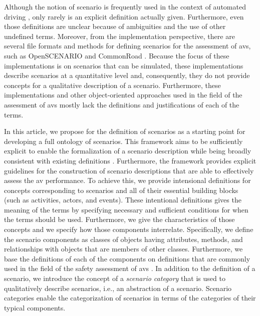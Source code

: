 Although the notion of scenario is frequently used in the context of automated driving \autocite{gietelink2006development, ebner2011identifying, hulshof2013autonomous, xiong2015orchestration, zofka2015datadrivetrafficscenarios, putz2017pegasus, roesener2017comprehensive, ploeg2017GCDC, shao2019evaluating}, \cendc\cstartd only rarely is an explicit definition actually given. 
Furthermore, even those definitions are unclear because of ambiguities and the use of other undefined terms. \cendd
\cstartf Moreover, \cendf\cstartc from the implementation perspective, there are several file formats and methods for defining scenarios for the assessment of \acp{av}, such as OpenSCENARIO \autocite{openscenario} and CommonRoad \autocite{althoff2017CommonRoad}.
Because the focus of these implementations is on scenarios that can be simulated, these implementations describe scenarios at a quantitative level and, consequently, they do not provide concepts for a qualitative description of a scenario.
Furthermore, these implementations and other object-oriented approaches used in the field of the assessment of \acp{av} \autocite{tsai2003scenario, utting2012taxonomy, zofka2016testing, wittmann2017method} \cstartf mostly \cendf lack the definitions and justifications of each of the terms.

In this article, we propose  for the definition of scenarios \cendc\cstartd as a starting point for developing a full ontology of scenarios. 
This framework aims to be sufficiently explicit to enable the formalization of a scenario description while being broadly consistent with existing definitions \autocite{geyer2014, ulbrich2015, elrofai2016scenario}. \cendd\cstartc 
Furthermore, the framework provides explicit guidelines for the construction of scenario descriptions that are able to effectively assess the \ac{av} performance.
To achieve this, \cendc\cstartd we provide intensional definitions for concepts corresponding to scenarios and all of their \cendd\cstartc essential building blocks (such as activities, actors, and events). \cendc
\cstartf These intentional definitions gives the meaning of the terms by specifying necessary and sufficient conditions for when the terms should be used.
Furthermore, \cendf\cstartd we give \cendd\cstartc the characteristics of those concepts and \cendc\cstartd we specify \cendd\cstartc how those components interrelate. 
\cendc\cstartd Specifically, we define the scenario components \cendd\cstartc as classes of objects having attributes, methods, and relationships with objects that are members of other classes.
\cendc\cstartd Furthermore, we base the definitions of each of the components on definitions \cendd\cstartc that are commonly used in the field of the safety assessment of \acp{av} \autocite{geyer2014, ulbrich2015, catapult2018musicc, catapult2018regulating, sigsim2019glossary, openscenario}. 
In addition to the definition of a scenario, we introduce the concept of a \emph{scenario category} that is used to qualitatively describe scenarios, i.e., an abstraction of a scenario. Scenario categories enable the categorization of scenarios in terms of the categories of their typical components.


